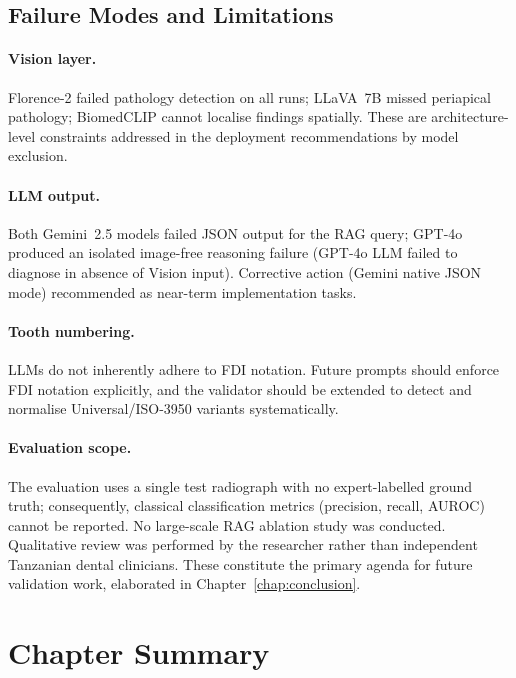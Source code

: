 \documentclass[12pt,a4paper]{report}
\begin{document}
	\subsection{Failure Modes and Limitations}
	
	\paragraph{Vision layer.}
	Florence-2 failed pathology detection on all runs; LLaVA~7B missed periapical
	pathology; BiomedCLIP cannot localise findings spatially. These are
	architecture-level constraints addressed in the deployment recommendations
	by model exclusion.
	
	\paragraph{LLM output.}
	Both Gemini~2.5 models failed JSON output for the RAG query; GPT-4o produced an isolated image-free reasoning
	failure (GPT-4o LLM failed to diagnose in absence of Vision input). Corrective action (Gemini native JSON mode) recommended as near-term implementation tasks.
	
	\paragraph{Tooth numbering.}
	LLMs do not inherently adhere to FDI notation. Future prompts should enforce
	FDI notation explicitly, and the validator should be extended to detect and
	normalise Universal/ISO-3950 variants systematically.
	
	\paragraph{Evaluation scope.}
	The evaluation uses a single test radiograph with no expert-labelled ground
	truth; consequently, classical classification metrics (precision, recall, AUROC)
	cannot be reported. No large-scale RAG ablation study was conducted. Qualitative
	review was performed by the researcher rather than independent Tanzanian dental
	clinicians. These constitute the primary agenda for future validation work,
	elaborated in Chapter~\ref{chap:conclusion}.
	
	\section{Chapter Summary}
	\label{sec:ch5_summary}
	
\end{document}
